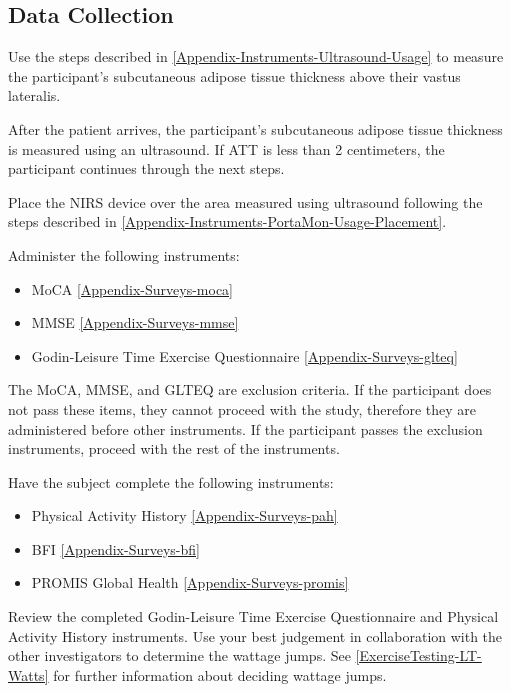\documentclass[
]{book}
\providecommand{\tightlist}{%
  \setlength{\itemsep}{0pt}\setlength{\parskip}{0pt}}
\begin{document}
\hypertarget{Methods-LT-DataCollection}{%
\subsection{Data Collection}\label{Methods-LT-DataCollection}}

Use the steps described in \ref{Appendix-Instruments-Ultrasound-Usage} to measure the participant's subcutaneous adipose tissue thickness above their vastus lateralis.

After the patient arrives, the participant's subcutaneous adipose tissue thickness is measured using an ultrasound. If ATT is less than 2 centimeters, the participant continues through the next steps.

Place the NIRS device over the area measured using ultrasound following the steps described in \ref{Appendix-Instruments-PortaMon-Usage-Placement}.

Administer the following instruments:

\begin{itemize}
\tightlist
\item
  MoCA \ref{Appendix-Surveys-moca}
\item
  MMSE \ref{Appendix-Surveys-mmse}
\item
  Godin-Leisure Time Exercise Questionnaire \ref{Appendix-Surveys-glteq}
\end{itemize}

The MoCA, MMSE, and GLTEQ are exclusion criteria. If the participant does not pass these items, they cannot proceed with the study, therefore they are administered before other instruments. If the participant passes the exclusion instruments, proceed with the rest of the instruments.

Have the subject complete the following instruments:

\begin{itemize}
\tightlist
\item
  Physical Activity History \ref{Appendix-Surveys-pah}
\item
  BFI \ref{Appendix-Surveys-bfi}
\item
  PROMIS Global Health \ref{Appendix-Surveys-promis}
\end{itemize}

Review the completed Godin-Leisure Time Exercise Questionnaire and Physical Activity History instruments. Use your best judgement in collaboration with the other investigators to determine the wattage jumps. See \ref{ExerciseTesting-LT-Watts} for further information about deciding wattage jumps.
\end{document}
